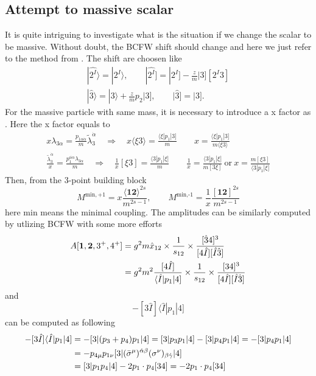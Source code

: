 \documentclass[12pt]{article}
\numberwithin{equation}{section}
\newcommand{\avg}[1]{\langle #1 \rangle}
\newcommand{\aket}[1]{|#1\rangle}
\newcommand{\sket}[1]{|#1]}
\newcommand{\asbra}[3]{\langle #1 | #2 |#3 ]}
\begin{document}
\subsection{Attempt to massive scalar}
It is quite intriguing to investigate what is the situation if we change the scalar to be massive. Without doubt, the BCFW shift should change and here we just refer to the method from \cite{Ballav:2020ese}.
The shift are choosen like 
\begin{gather}
    \aket{\hat{2^I}}=\aket{2^I},\qquad \sket{\hat{2^I}}=\sket{2^I}-\frac{z}{m}\sket{3}[2^I3]\\
    \aket{\hat{3}}=\aket{3}+\frac{z}{m}p_2\sket{3},\qquad \sket{\hat{3}}=\sket{3}.
\end{gather}
For the massive particle with same mass, it is necessary to introduce a x factor as \cite{Arkani-Hamed:2017jhn}. Here the x factor equals to
\begin{gather}
    x\lambda_{3\alpha}=\frac{p_{1\alpha\dot{\alpha}}}{m}\tilde{\lambda}_3^{\dot{\alpha}}\quad \Rightarrow \quad x\avg{\xi 3 }=\frac{\asbra{\xi}{p_1}{3}}{m}\qquad x=\frac{\asbra{\xi}{p_1}{3}}{m\avg{\xi 3}}\\
    \frac{\tilde{\lambda}_3^{\dot{\alpha}}}{x}=\frac{p_1^{\dot{\alpha \alpha}}\lambda_{3\alpha}}{m}\quad \Rightarrow \quad \frac{1}{x}[\xi3]=\frac{\asbra{3}{p_1}{\xi}}{m}\qquad \frac{1}{x}=\frac{\asbra{3}{p_1}{\xi}}{m[3\xi]} ~\text{or}~ x=\frac{m[\xi3]}{\asbra{3}{p_1}{\xi}}
\end{gather}
Then, from the 3-point building block
\begin{equation}
    M^{\text{min},+1}=x\frac{\avg{\textbf{12}}^{2s}}{m^{2s-1}},\qquad M^{\text{min,-1}}=\frac{1}{x}\frac{[\textbf{12}]^{2s}}{m^{2s-1}}
\end{equation}
here min means the minimal coupling. The amplitudes can be similarly computed by utlizing BCFW with some more efforts
\begin{align}
    A[\textbf{1},\textbf{2},3^+,4^+]&=g^2m \hat{x}_{12}\times\frac{1}{s_{12}}\times \frac{[\hat{3}4]^3}{[4\hat{I}][\hat{I}\hat{3}]}\notag\\
    &=g^2m^2\frac{[4\hat{I}]}{\asbra{\hat{I}}{p_1}{4}}\times\frac{1}{s_{12}}\times \frac{[34]^3}{[4\hat{I}][\hat{I}\hat{3}]}
\end{align}
and
\begin{equation}
    -[3\hat{I}]\asbra{\hat{I}}{p_1}{4}
\end{equation}
can be computed as following
\begin{align}
    -[3\hat{I}]\asbra{\hat{I}}{p_1}{4}&=-[3|(p_3+p_4)p_1|4]=[3|p_3p_1|4]-[3|p_4p_1|4]=-[3|p_4p_1|4]\notag\\
    &=-p_{4\mu} p_{1\nu}[3|(\bar{\sigma}^\mu)^{\dot{\alpha}\beta}(\sigma^\nu)_{\beta\dot{\gamma}}|4]\notag\\
    &=[3|p_1p_4|4]-2p_1\cdot p_4[34]=-2p_1\cdot p_4[34]
\end{align}
\end{document}
